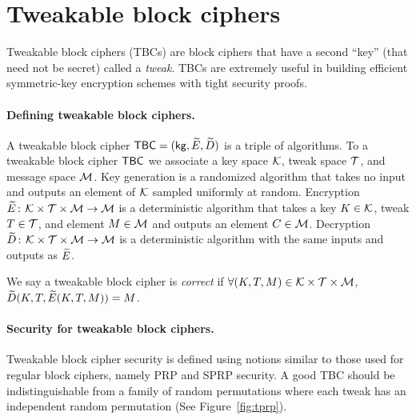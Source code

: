 



\section{Tweakable block ciphers}
\label{sec:tbcs}

Tweakable block ciphers (TBCs) are block ciphers that have a second ``key'' (that need not be secret) called a \emph{tweak}. TBCs are extremely useful in building efficient symmetric-key encryption schemes with tight security proofs.




\paragraph{Defining tweakable block ciphers.} A tweakable block cipher $\mathsf{TBC} = ({\sf kg}, \widetilde{E}, \widetilde{D})$ is a triple of 
algorithms. To a tweakable block cipher $\mathsf{TBC}$ we associate a key space ${\cal K}$, tweak space $\mathcal{T}$, and message space ${\cal M}$. Key generation is a randomized algorithm that takes no input and outputs an element of ${\cal K}$ sampled uniformly at random. Encryption $\widetilde{E}{{\kern .05em}\colon{\kern .05em}}{\cal K}\times\mathcal{T}\times{\cal M}\rightarrow{\cal M}$ is a deterministic algorithm that takes a key $K\in{\cal K}$, tweak $T\in\mathcal{T}$, and element $M\in{\cal M}$ and outputs an element $C\in{\cal M}$. Decryption $\widetilde{D}{{\kern .05em}\colon{\kern .05em}}{\cal K}\times\mathcal{T}\times{\cal M}\rightarrow{\cal M}$ is a deterministic algorithm with the same inputs and outputs as $\widetilde{E}$.

We say a tweakable block cipher is \emph{correct} if $\forall (K, T, M)\in{\cal K}\times\mathcal{T}\times{\cal M}$, $\widetilde{D}(K, T, \widetilde{E}(K, T, M))=M$.

\paragraph{Security for tweakable block ciphers.}

Tweakable block cipher security is defined using notions similar to those used for regular block ciphers, namely PRP and SPRP security. A good TBC should be indistinguishable from a family of random permutations where each tweak has an independent random permutation (See Figure~\ref{fig:tprp}).

